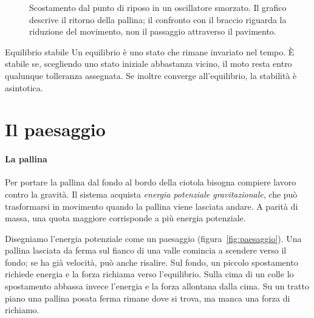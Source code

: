 \documentclass[11pt]{article}
\begin{document}
\begin{figure}[htbp]
\centering
{}
\caption{Scostamento dal punto di riposo in un oscillatore smorzato. Il grafico descrive il ritorno della pallina; il confronto con il braccio riguarda la riduzione del movimento, non il passaggio attraverso il pavimento.}
\label{fig:onda}
\end{figure}

\begin{parola}{Equilibrio stabile}
Un equilibrio è uno stato che rimane invariato nel tempo. È stabile se, scegliendo uno stato iniziale abbastanza vicino, il moto resta entro qualunque tolleranza assegnata. Se inoltre converge all'equilibrio, la stabilità è asintotica.
\end{parola}

\section{Il paesaggio}\label{sec:paesaggio}

\paragraph{La pallina} Per portare la pallina dal fondo al bordo della ciotola bisogna compiere lavoro contro la gravità. Il sistema acquista \emph{energia potenziale gravitazionale}, che può trasformarsi in movimento quando la pallina viene lasciata andare. A parità di massa, una quota maggiore corrisponde a più energia potenziale.

Disegniamo l'energia potenziale come un paesaggio (figura~\ref{fig:paesaggio}). Una pallina lasciata da ferma sul fianco di una valle comincia a scendere verso il fondo; se ha già velocità, può anche risalire. Sul fondo, un piccolo spostamento richiede energia e la forza richiama verso l'equilibrio. Sulla cima di un colle lo spostamento abbassa invece l'energia e la forza allontana dalla cima. Su un tratto piano una pallina posata ferma rimane dove si trova, ma manca una forza di richiamo.
\end{document}
